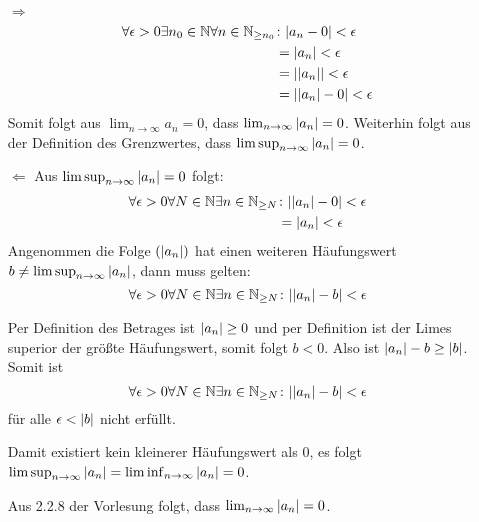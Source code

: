 \documentclass{article}
\begin{document}
\begin{itemize}
\item[$\Rightarrow$]
  \begin{align*}
    \forall \epsilon > 0 \exists n_0 \in \mathbb{N} \forall n \in \mathbb{N}_{\geq n_0} &\colon \abs{a_n - 0} < \epsilon \\
                                                                                        &= \abs{a_n} < \epsilon \\
                                                                                        &= \abs{\abs{a_n}} < \epsilon \\
                                                                                        &= \abs{\abs{a_n} - 0} < \epsilon \\
  \end{align*}
  Somit folgt aus $\lim_{n \to \infty} a_n = 0$, dass $\lim_{n \to \infty} \abs{a_n} = 0$.
  Weiterhin folgt aus der Definition des Grenzwertes, dass $\limsup_{n \to \infty} \abs{a_n} = 0$.
\item[$\Leftarrow$]
  Aus $\limsup_{n \to \infty} \abs{a_n} = 0$ folgt:
  \begin{align*}
    \forall \epsilon > 0 \forall N \in \mathbb{N} \exists n \in \mathbb{N}_{\geq N} &\colon \abs{\abs{a_n} - 0} < \epsilon \\
                                                                                    &= \abs{a_n} < \epsilon \\
  \end{align*}
  Angenommen die Folge $(\abs{a_n})$ hat einen weiteren Häufungswert $b \ne \limsup_{n \to \infty} \abs{a_n}$,
  dann muss gelten:
  \[
    \forall \epsilon > 0 \forall N \in \mathbb{N} \exists n \in \mathbb{N}_{\geq N} \colon \abs{\abs{a_n} - b} < \epsilon
  \]

  Per Definition des Betrages ist $\abs{a_n} \geq 0$ und per Definition ist der Limes superior der
  größte Häufungswert, somit folgt $b < 0$. Also ist $\abs{a_n} - b \geq \abs{b}$.
  Somit ist
  \[
    \forall \epsilon > 0 \forall N \in \mathbb{N} \exists n \in \mathbb{N}_{\geq N} \colon \abs{\abs{a_n} - b} < \epsilon
  \]
  für alle $\epsilon < \abs{b}$ nicht erfüllt.

  Damit existiert kein kleinerer Häufungswert als $0$, es folgt \\
  $\limsup_{n \to \infty} \abs{a_n} = \liminf_{n \to \infty} \abs{a_n} = 0$.
  
  Aus 2.2.8 der Vorlesung folgt, dass $\lim_{n \to \infty} \abs{a_n} = 0$. 
  
\end{itemize}
\end{document}
